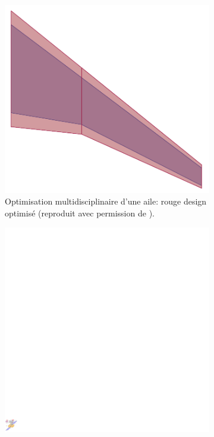 \documentclass[12pt, french]{article}
\begin{document}
\begin{figure}[t]
	\begin{subfigure}[t]{0.3\textwidth}
		\includegraphics[width=\columnwidth]{MDo_wing.png}%
		\caption{Optimisation multidisciplinaire d'une aile: rouge design optimisé (reproduit avec permission de \cite{masColomer2021mdo}). }
		\label{fig:wing}
	\end{subfigure}\hfill
	\begin{subfigure}[t]{0.3\textwidth}
		\includegraphics[width=\columnwidth]{Codesign_satellite.pdf} 

\end{subfigure}
\end{figure}
\end{document}
